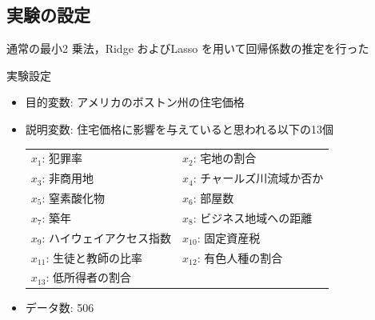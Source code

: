 \documentclass[dvipdfmx, 10pt]{beamer}
\begin{document}
\subsection{実験の設定}
\begin{frame}{\insertsubsection}
    通常の最小2 乗法，Ridge およびLasso を用いて回帰係数の推定を行った
    \begin{block}{実験設定}
        \begin{itemize}
                \item 目的変数: アメリカのボストン州の住宅価格
                \item 説明変数: 住宅価格に影響を与えていると思われる以下の13個
                    \begin{table}[htb]
                    	\begin{tabular}{ll}
                    	$x_1$: 犯罪率  & $x_2$: 宅地の割合\\
                    	$x_3$: 非商用地 &  $x_4$: チャールズ川流域か否か\\
                    	$x_5$: 窒素酸化物 &  $x_6$: 部屋数\\
                    	$x_7$: 築年 &  $x_8$: ビジネス地域への距離\\
                    	$x_9$: ハイウェイアクセス指数 &  $x_{10}$: 固定資産税\\
                    	$x_{11}$: 生徒と教師の比率 &  $x_{12}$: 有色人種の割合\\
                    	$x_{13}$: 低所得者の割合\\
                    	\end{tabular}
                    \end{table}
                \item データ数: 506
        \end{itemize}
    \end{block}
\end{frame}
\end{document}
